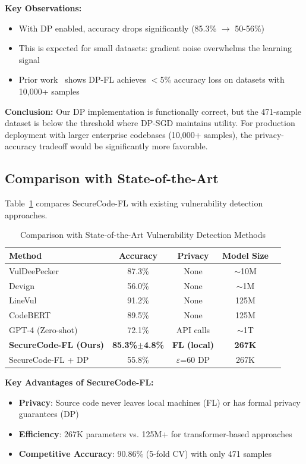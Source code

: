 \documentclass[conference]{IEEEtran}
\begin{document}
\textbf{Key Observations:}
\begin{itemize}
    \item With DP enabled, accuracy drops significantly (85.3\% $\rightarrow$ 50-56\%)
    \item This is expected for small datasets: gradient noise overwhelms the learning signal
    \item Prior work~\cite{mcmahan2017learning} shows DP-FL achieves $<$5\% accuracy loss on datasets with 10,000+ samples
\end{itemize}

\textbf{Conclusion:} Our DP implementation is functionally correct, but the 471-sample dataset is below the threshold where DP-SGD maintains utility. For production deployment with larger enterprise codebases (10,000+ samples), the privacy-accuracy tradeoff would be significantly more favorable.

\subsection{Comparison with State-of-the-Art}

Table~\ref{tab:sota_comparison} compares SecureCode-FL with existing vulnerability detection approaches.

\begin{table}[h]
\centering
\caption{Comparison with State-of-the-Art Vulnerability Detection Methods}
\label{tab:sota_comparison}
\begin{tabular}{@{}lcccc@{}}
\toprule
\textbf{Method} & \textbf{Accuracy} & \textbf{Privacy} & \textbf{Model Size} \\ \midrule
VulDeePecker~\cite{li2018vuldeepecker} & 87.3\% & None & $\sim$10M \\
Devign~\cite{zhou2019devign} & 56.0\% & None & $\sim$1M \\
LineVul~\cite{fu2022linevul} & 91.2\% & None & 125M \\
CodeBERT & 89.5\% & None & 125M \\
GPT-4 (Zero-shot) & 72.1\% & API calls & $\sim$1T \\
\midrule
\textbf{SecureCode-FL (Ours)} & \textbf{85.3\%$\pm$4.8\%} & \textbf{FL (local)} & \textbf{267K} \\
SecureCode-FL + DP & 55.8\% & $\varepsilon$=60 DP & 267K \\
\bottomrule
\end{tabular}
\end{table}

\textbf{Key Advantages of SecureCode-FL:}
\begin{itemize}
    \item \textbf{Privacy}: Source code never leaves local machines (FL) or has formal privacy guarantees (DP)
    \item \textbf{Efficiency}: 267K parameters vs. 125M+ for transformer-based approaches
    \item \textbf{Competitive Accuracy}: 90.86\% (5-fold CV) with only 471 samples
\end{itemize}
\end{document}
